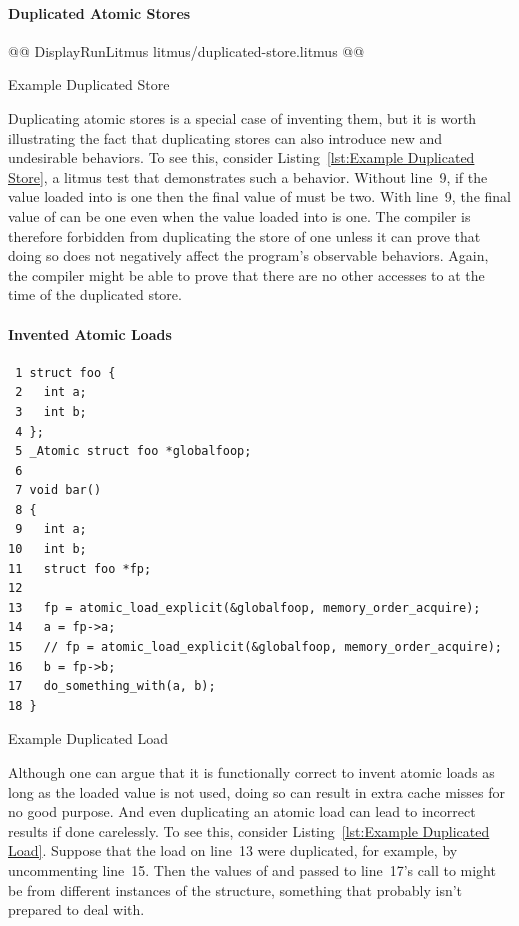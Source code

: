 \documentclass[10]{article}
\begin{document}
\paragraph{Duplicated Atomic Stores}
\begin{listing}[tbp]
@@ DisplayRunLitmus litmus/duplicated-store.litmus @@
\caption{Example Duplicated Store}
\label{lst:Example Duplicated Store}
\end{listing}
Duplicating atomic stores is a special case of inventing them, but it is
worth illustrating the fact that duplicating stores can also introduce
new and undesirable behaviors.
To see this, consider Listing~\ref{lst:Example Duplicated Store}, a
litmus test that demonstrates such a behavior.
Without line~9, if the value loaded into  is one then the final value
of  must be two.
With line~9, the final value of  can be one even when the
value loaded into  is one.
The compiler is therefore forbidden from duplicating the store of one
unless it can prove that doing so does not negatively affect the
program's observable behaviors.
Again, the compiler might be able to prove that there
are no other accesses to  at the time of the duplicated store.

\paragraph{Invented Atomic Loads}
\begin{listing}[tbp]
\scriptsize
\begin{verbatim}
 1 struct foo {
 2   int a;
 3   int b;
 4 };
 5 _Atomic struct foo *globalfoop;
 6
 7 void bar()
 8 {
 9   int a;
10   int b;
11   struct foo *fp;
12
13   fp = atomic_load_explicit(&globalfoop, memory_order_acquire);
14   a = fp->a;
15   // fp = atomic_load_explicit(&globalfoop, memory_order_acquire);
16   b = fp->b;
17   do_something_with(a, b);
18 }
\end{verbatim}
\caption{Example Duplicated Load}
\label{lst:Example Duplicated Load}
\end{listing}
Although one can argue that it is functionally correct to invent atomic
loads as long as the loaded value is not used, doing so can result in
extra cache misses for no good purpose.
And even duplicating an atomic load can lead to incorrect results if done
carelessly.
To see this, consider
Listing~\ref{lst:Example Duplicated Load}.
Suppose that the load on line~13 were duplicated, for example, by
uncommenting line~15.
Then the values of  and  passed to line~17's call to
 might be from different instances of the
 structure, something that  probably
isn't prepared to deal with.
\end{document}
